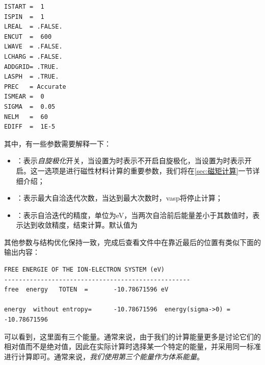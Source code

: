 \begin{lstlisting}[caption=INCAR]
ISTART =  1
ISPIN  =  1
LREAL  = .FALSE.
ENCUT  =  600
LWAVE  = .FALSE.
LCHARG = .FALSE.
ADDGRID= .TRUE.
LASPH  = .TRUE.
PREC   = Accurate
ISMEAR =  0
SIGMA  =  0.05
NELM   =  60
EDIFF  =  1E-5
\end{lstlisting}

其中，有一些参数需要解释一下：

\begin{itemize}
    \item {}：表示\emph{自旋极化}开关，当设置为时表示不开启自旋极化，当设置为时表示开启。这一选项是进行磁性材料计算的重要参数，我们将在\ref{sec:磁矩计算}一节详细介绍；
    \item {}：表示最大自洽迭代次数，当达到最大次数时，vasp将停止计算；
    \item {}：表示自洽迭代的精度，单位为eV，当两次自洽前后能量差小于其数值时，表示达到收敛精度，结束计算。默认值为
\end{itemize}

其他参数与结构优化保持一致，完成后查看文件中在靠近最后的位置有类似下面的输出内容：

\begin{lstlisting}[caption=OUTCAR]
FREE ENERGIE OF THE ION-ELECTRON SYSTEM (eV)
---------------------------------------------------
free  energy   TOTEN  =       -10.78671596 eV

energy  without entropy=      -10.78671596  energy(sigma->0) =      -10.78671596
\end{lstlisting}

可以看到，这里面有三个能量。通常来说，由于我们的计算能量更多是讨论它们的相对值而不是绝对值，因此在实际计算时选择某一个特定的能量，并采用同一标准进行计算即可。通常来说，\emph{我们使用第三个能量作为体系能量}。

